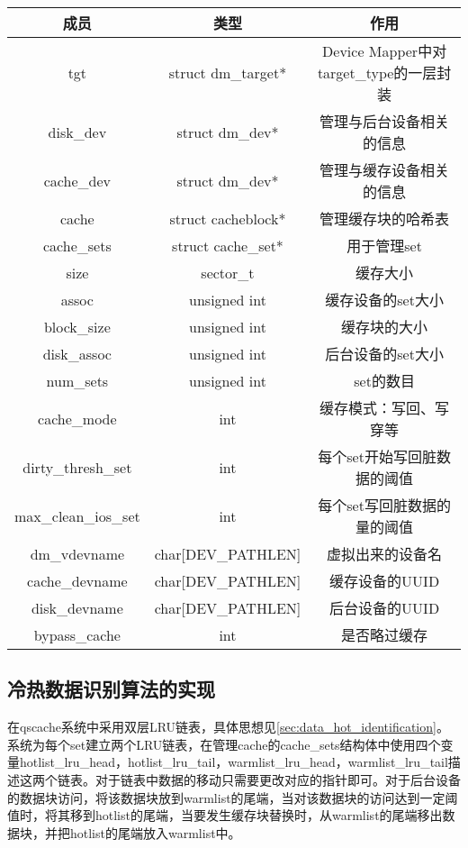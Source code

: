 \begin{table}[!htbp]
    \centering
    \begin{tabular}{ccc} 
        \toprule
        成员 & 类型 & 作用\\
        \midrule
        tgt & struct dm\_target* & Device Mapper中对target\_type的一层封装 \\ 
        disk\_dev & struct dm\_dev* & 管理与后台设备相关的信息 \\ 
        cache\_dev & struct dm\_dev* & 管理与缓存设备相关的信息 \\ 
        cache & struct cacheblock* & 管理缓存块的哈希表 \\ 
        cache\_sets & struct cache\_set* & 用于管理set \\ 
        size & sector\_t & 缓存大小 \\ 
        assoc & unsigned int & 缓存设备的set大小 \\ 
        block\_size & unsigned int & 缓存块的大小 \\ 
        disk\_assoc & unsigned int & 后台设备的set大小 \\ 
        num\_sets & unsigned int & set的数目 \\ 
        cache\_mode & int & 缓存模式：写回、写穿等 \\ 
        dirty\_thresh\_set & int & 每个set开始写回脏数据的阈值 \\ 
        max\_clean\_ios\_set & int & 每个set写回脏数据的量的阈值 \\ 
        dm\_vdevname & char[DEV\_PATHLEN] & 虚拟出来的设备名 \\ 
        cache\_devname & char[DEV\_PATHLEN] & 缓存设备的UUID \\ 
        disk\_devname & char[DEV\_PATHLEN] & 后台设备的UUID \\ 
        bypass\_cache & int & 是否略过缓存 \\      
        \bottomrule
    \end{tabular}
\end{table}

\subsection{冷热数据识别算法的实现}

在qscache系统中采用双层LRU链表，具体思想见\ref{sec:data_hot_identification}。系统为每个set建立两个LRU链表，在管理cache的cache\_sets结构体中使用四个变量hotlist\_lru\_head，hotlist\_lru\_tail，warmlist\_lru\_head，warmlist\_lru\_tail描述这两个链表。对于链表中数据的移动只需要更改对应的指针即可。对于后台设备的数据块访问，将该数据块放到warmlist的尾端，当对该数据块的访问达到一定阈值时，将其移到hotlist的尾端，当要发生缓存块替换时，从warmlist的尾端移出数据块，并把hotlist的尾端放入warmlist中。

